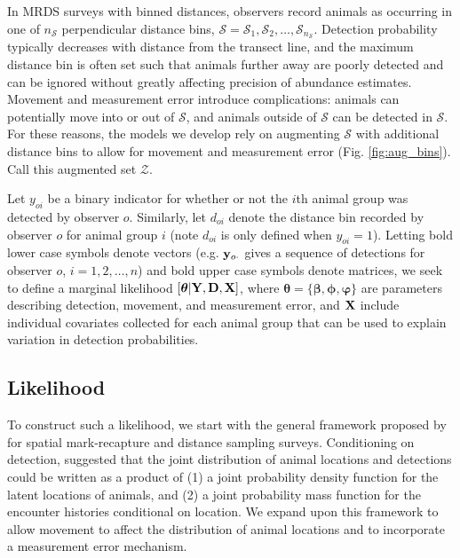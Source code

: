 \documentclass[12pt,fleqn]{article}
\begin{document}
In MRDS surveys with binned distances, observers record animals as occurring in one of $n_\mathcal{S}$ perpendicular distance bins, $\mathcal{S} = \mathcal{S}_1,\mathcal{S}_2,\hdots,\mathcal{S}_{n_\mathcal{S}}$.  Detection probability typically decreases with distance from the transect line, and the maximum distance bin is often set such that animals further away are poorly detected and can be ignored without greatly affecting precision of abundance estimates.  Movement and measurement error introduce complications: animals can potentially move into or out of $\mathcal{S}$, and animals outside of $\mathcal{S}$ can be detected in $\mathcal{S}$.  For these reasons, the models we develop rely on augmenting $\mathcal{S}$ with additional distance bins to allow for movement and measurement error (Fig. \ref{fig:aug_bins}).  Call this augmented set $\mathcal{Z}$.

Let $y_{oi}$ be a binary indicator for whether or not the $i$th animal group was detected by observer $o$.  Similarly, let $d_{oi}$ denote the distance bin recorded by observer $o$ for animal group $i$ (note $d_{oi}$ is only defined when $y_{oi}=1$). Letting bold lower case symbols denote vectors (e.g. ${\bf y}_{o \cdot}$ gives a sequence of detections for observer $o$, $i=1,2,\hdots,n$) and bold upper case symbols denote matrices, we seek to define a marginal likelihood $[\boldsymbol{\theta} | {\bf Y},{\bf D}, {\bf X}]$, where $\boldsymbol{\theta}= \{ \boldsymbol{\beta,\phi,\varphi} \}$ are parameters describing detection, movement, and measurement error, and ${\bf X}$ include individual covariates collected for each animal group that can be used to explain variation in detection probabilities.

\subsection{Likelihood}

To construct such a likelihood, we start with the general framework proposed by \citet{BorchersEtAl2015} for spatial mark-recapture and distance sampling surveys.  Conditioning on detection, \citet{BorchersEtAl2015} suggested that the joint distribution of animal locations and detections could be written as a product of (1) a joint probability density function for the latent locations of animals, and (2) a joint probability mass function for the encounter histories conditional on location.  We expand upon this framework to allow movement to affect the distribution of animal locations and to incorporate a measurement error mechanism.
\end{document}
